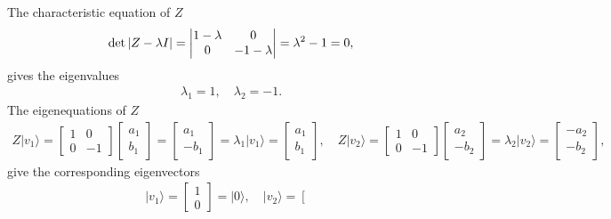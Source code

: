 \documentclass[en]{sol-man}
\begin{document}
\begin{sol}
    The characteristic equation of $Z$
    \begin{align}
        \det\left\lvert Z-\lambda I\right\rvert=\left\lvert\begin{matrix}
            1-\lambda&0\\
            0&-1-\lambda
        \end{matrix}\right\rvert=\lambda^2-1=0,
    \end{align}
    gives the eigenvalues
    \begin{align}
        \lambda_1=1,\quad\lambda_2=-1.
    \end{align}
    The eigenequations of $Z$
    \begin{align}
        Z\lvert v_1\rangle=\left[\begin{matrix}
            1&0\\
            0&-1
        \end{matrix}\right]\left[\begin{matrix}
            a_1\\
            b_1
        \end{matrix}\right]=\left[\begin{matrix}
            a_1\\
            -b_1
        \end{matrix}\right]=\lambda_1\lvert v_1\rangle=\left[\begin{matrix}
            a_1\\
            b_1
        \end{matrix}\right],\quad Z\lvert v_2\rangle=\left[\begin{matrix}
            1&0\\
            0&-1
        \end{matrix}\right]\left[\begin{matrix}
            a_2\\
            -b_2
        \end{matrix}\right]=\lambda_2\lvert v_2\rangle=\left[\begin{matrix}
            -a_2\\
            -b_2
        \end{matrix}\right],
    \end{align}
    give the corresponding eigenvectors
    \begin{align}
        \lvert v_1\rangle=\left[\begin{matrix}
            1\\
            0
        \end{matrix}\right]=\lvert 0\rangle,\quad\lvert v_2\rangle=\left[\begin{matrix}

\end{matrix}
\end{align}
\end{sol}
\end{document}
